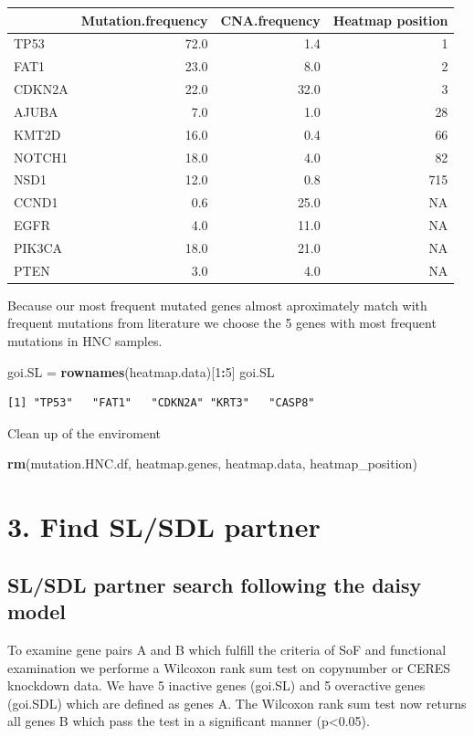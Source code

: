 \documentclass[]{article}
\newenvironment{Shaded}{\begin{snugshade}}{\end{snugshade}}
\newcommand{\KeywordTok}[1]{\textcolor[rgb]{0.13,0.29,0.53}{\textbf{#1}}}
\newcommand{\DecValTok}[1]{\textcolor[rgb]{0.00,0.00,0.81}{#1}}
\newcommand{\StringTok}[1]{\textcolor[rgb]{0.31,0.60,0.02}{#1}}
\newcommand{\OperatorTok}[1]{\textcolor[rgb]{0.81,0.36,0.00}{\textbf{#1}}}
\newcommand{\NormalTok}[1]{#1}
\begin{document}
\begin{longtable}[]{@{}lrrr@{}}
\toprule
& Mutation.frequency & CNA.frequency & Heatmap position\tabularnewline
\midrule
\endhead
TP53 & 72.0 & 1.4 & 1\tabularnewline
FAT1 & 23.0 & 8.0 & 2\tabularnewline
CDKN2A & 22.0 & 32.0 & 3\tabularnewline
AJUBA & 7.0 & 1.0 & 28\tabularnewline
KMT2D & 16.0 & 0.4 & 66\tabularnewline
NOTCH1 & 18.0 & 4.0 & 82\tabularnewline
NSD1 & 12.0 & 0.8 & 715\tabularnewline
CCND1 & 0.6 & 25.0 & NA\tabularnewline
EGFR & 4.0 & 11.0 & NA\tabularnewline
PIK3CA & 18.0 & 21.0 & NA\tabularnewline
PTEN & 3.0 & 4.0 & NA\tabularnewline
\bottomrule
\end{longtable}

Because our most frequent mutated genes almost aproximately match with
frequent mutations from literature we choose the 5 genes with most
frequent mutations in HNC samples.

\begin{Shaded}
\begin{Highlighting}[]
\NormalTok{goi.SL =}\StringTok{ }\KeywordTok{rownames}\NormalTok{(heatmap.data)[}\DecValTok{1}\OperatorTok{:}\DecValTok{5}\NormalTok{]}
\NormalTok{goi.SL}
\end{Highlighting}
\end{Shaded}

\begin{verbatim}
[1] "TP53"   "FAT1"   "CDKN2A" "KRT3"   "CASP8" 
\end{verbatim}

Clean up of the enviroment

\begin{Shaded}
\begin{Highlighting}[]
\KeywordTok{rm}\NormalTok{(mutation.HNC.df, heatmap.genes, heatmap.data, heatmap_position)}
\end{Highlighting}
\end{Shaded}

\section{3. Find SL/SDL partner}\label{find-slsdl-partner}

\subsection{SL/SDL partner search following the daisy
model}\label{slsdl-partner-search-following-the-daisy-model}

To examine gene pairs A and B which fulfill the criteria of SoF and
functional examination we performe a Wilcoxon rank sum test on
copynumber or CERES knockdown data. We have 5 inactive genes (goi.SL)
and 5 overactive genes (goi.SDL) which are defined as genes A. The
Wilcoxon rank sum test now returns all genes B which pass the test in a
significant manner (p\textless{}0.05).
\end{document}
